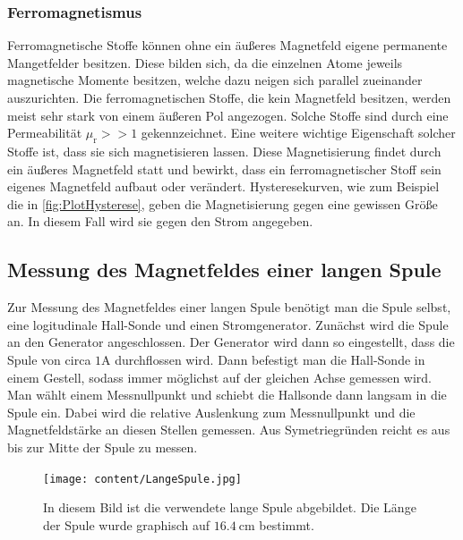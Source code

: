 \subsubsection{Ferromagnetismus}
\label{subsubsec:FERRO}
Ferromagnetische Stoffe können ohne ein äußeres Magnetfeld eigene permanente Mangetfelder besitzen. Diese bilden sich, da die einzelnen Atome jeweils magnetische Momente besitzen, welche 
dazu neigen sich parallel zueinander auszurichten. Die ferromagnetischen Stoffe, die kein Magnetfeld besitzen, werden meist sehr stark von einem äußeren Pol angezogen. Solche Stoffe 
sind durch eine Permeabilität $\mu_{\text{r}} >> 1$ gekennzeichnet. Eine weitere wichtige Eigenschaft solcher Stoffe ist, dass sie sich magnetisieren lassen. Diese Magnetisierung findet
durch ein äußeres Magnetfeld statt und bewirkt, dass ein ferromagnetischer Stoff sein eigenes Magnetfeld aufbaut oder verändert. Hysteresekurven, wie zum Beispiel die in \autoref{fig:PlotHysterese},
geben die Magnetisierung gegen eine gewissen Größe an. In diesem Fall wird sie gegen den Strom angegeben.
\subsection{Messung des Magnetfeldes einer langen Spule}
\label{subsec:D_Lange_Spule}
Zur Messung des Magnetfeldes einer langen Spule benötigt man die Spule selbst, eine logitudinale Hall-Sonde und einen Stromgenerator. Zunächst wird die Spule an den Generator angeschlossen.
Der Generator wird dann so eingestellt, dass die Spule von circa $1 \unit{\ampere}$ durchflossen wird. Dann befestigt man die Hall-Sonde in einem Gestell, sodass immer möglichst auf der
gleichen Achse gemessen wird. Man wählt einem Messnullpunkt und schiebt die Hallsonde dann langsam in die Spule ein. Dabei wird die relative Auslenkung zum Messnullpunkt und die Magnetfeldstärke 
an diesen Stellen gemessen. Aus Symetriegründen reicht es aus bis zur Mitte der Spule zu messen.
\begin{figure}
    \centering
    \caption{In diesem Bild ist die verwendete lange Spule abgebildet. Die Länge der Spule wurde graphisch auf $16.4 \: \unit{\centi\metre}$ bestimmt.}
    \label{fig:Aufbau_lange_Spule}
    \texttt{[image: content/LangeSpule.jpg]}
\end{figure}
